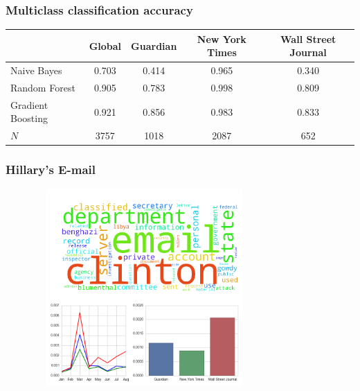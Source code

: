\documentclass[11pt]{beamer}
\begin{document}
\begin{frame}
\frametitle{Multiclass classification accuracy}

\begin{table}
\centering
\scriptsize 
\begin{tabular}{lcccc}
\toprule
				& Global		& Guardian 	& New York Times	& Wall Street Journal	\\ \midrule
Naive Bayes 		& 0.703		& 0.414		& 0.965	 		& 0.340				\\
Random Forest		& 0.905		& 0.783		& 0.998			& 0.809 				\\ 
Gradient Boosting	& 0.921		& 0.856		& 0.983			& 0.833				\\ 
$N$				& 3757    		& 1018		& 2087 			& 652	 			\\
\bottomrule
\end{tabular}
\end{table}

\end{frame}


\begin{frame}
\frametitle{Hillary's E-mail}

\begin{figure}
\centering
\includegraphics[width=85mm,height=75mm]{figures/source_topic0.png}
\end{figure} 

\end{frame}

\end{document}

